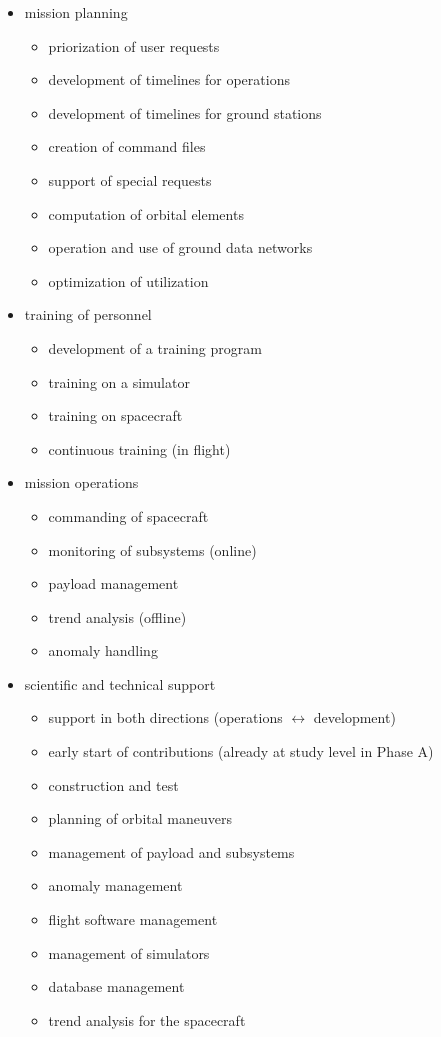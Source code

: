\begin{itemize}
 \item mission planning
 \begin{itemize}
  \item priorization of user requests
  \item development of timelines for operations
  \item development of timelines for ground stations
  \item creation of command files
  \item support of special requests
  \item computation of orbital elements
  \item operation and use of ground data networks
  \item optimization of utilization
 \end{itemize}

 \item training of personnel
 \begin{itemize}
  \item development of a training program
  \item training on a simulator
  \item training on spacecraft
  \item continuous training (in flight)
 \end{itemize}

 \item mission operations
 \begin{itemize}
  \item commanding of spacecraft
  \item monitoring of subsystems (online)
  \item payload management
  \item trend analysis (offline)
  \item anomaly handling
 \end{itemize}

 \item scientific and technical support 
 \begin{itemize}
  \item support in both directions (operations $\leftrightarrow$ development)
  \item early start of contributions (already at study level in Phase A)
  \item construction and test
  \item planning of orbital maneuvers
  \item management of payload and subsystems
  \item anomaly management
  \item flight software management
  \item management of simulators
  \item database management
  \item trend analysis for the spacecraft
 \end{itemize}

\end{itemize}
